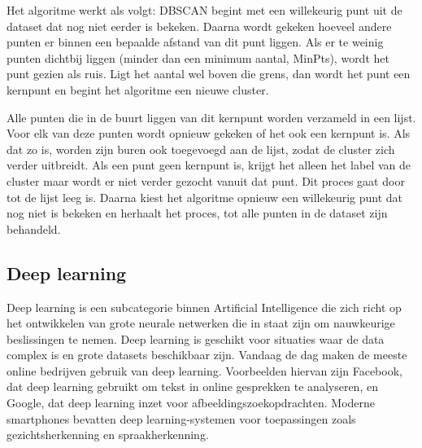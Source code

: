 \newpage

Het algoritme werkt als volgt: DBSCAN begint met een willekeurig punt uit de dataset dat nog niet eerder is bekeken. Daarna wordt gekeken hoeveel andere punten er binnen een bepaalde afstand van dit punt liggen. Als er te weinig punten dichtbij liggen (minder dan een minimum aantal, MinPts), wordt het punt gezien als ruis. Ligt het aantal wel boven die grens, dan wordt het punt een kernpunt en begint het algoritme een nieuwe cluster.

\vspace{1em}

Alle punten die in de buurt liggen van dit kernpunt worden verzameld in een lijst. Voor elk van deze punten wordt opnieuw gekeken of het ook een kernpunt is. Als dat zo is, worden zijn buren ook toegevoegd aan de lijst, zodat de cluster zich verder uitbreidt. Als een punt geen kernpunt is, krijgt het alleen het label van de cluster maar wordt er niet verder gezocht vanuit dat punt. Dit proces gaat door tot de lijst leeg is. Daarna kiest het algoritme opnieuw een willekeurig punt dat nog niet is bekeken en herhaalt het proces, tot alle punten in de dataset zijn behandeld.\autocite{Hanafi2022}

\subsection{Deep learning}

Deep learning is een subcategorie binnen Artificial Intelligence die zich richt op het ontwikkelen van grote neurale netwerken die in staat zijn om nauwkeurige beslissingen te nemen. Deep learning is geschikt voor situaties waar de data complex is en grote datasets beschikbaar zijn. Vandaag de dag maken de meeste online bedrijven gebruik van deep learning. Voorbeelden hiervan zijn Facebook, dat deep learning gebruikt om tekst in online gesprekken te analyseren, en Google, dat deep learning inzet voor afbeeldingszoekopdrachten. Moderne smartphones bevatten deep learning-systemen voor toepassingen zoals gezichtsherkenning en spraakherkenning. \autocite{Kelleher2019}




